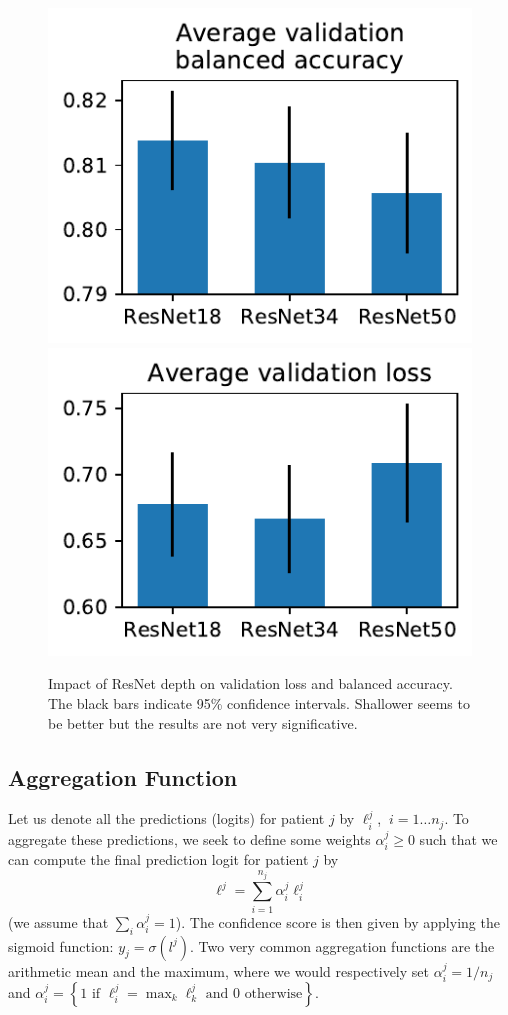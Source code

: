 \documentclass[final]{cvpr}
\begin{document}
\begin{figure}[t]
	\begin{center}
		\includegraphics[width=0.47\linewidth]{resnets_bal_acc.pdf}
		\includegraphics[width=0.47\linewidth]{resnets_val_loss.pdf}
	\end{center}
	\caption{Impact of ResNet depth on validation loss and balanced accuracy. The black bars indicate 95\% confidence intervals. Shallower seems to be better but the results are not very significative.}
	\label{fig:resnet}
\end{figure}


	\subsection{Aggregation Function}

Let us denote all the predictions (logits) for patient $j$ by $\ell_i^j$, $\: i=1 \dots n_j$.
To aggregate these predictions, we seek to define some weights $\alpha_i^j \geq 0$ such that we can compute the final prediction logit for patient $j$ by
$$\ell^j = \sum_{i=1}^{n_j} \alpha_i^j \ell_i^j$$
(we assume that $\sum_i \alpha_i^j = 1$).
The confidence score is then given by applying the sigmoid function: $y_j = \sigma(l^j)$.
Two very common aggregation functions are the arithmetic mean and the maximum, where we would respectively set $\alpha_i^j = 1/n_j$ and $\alpha_i^j = \left\{ 1 \text{ if } \ell_i^j = \max_k \ell_k^j \text{ and } 0 \text{ otherwise}\right\}$.
\end{document}

